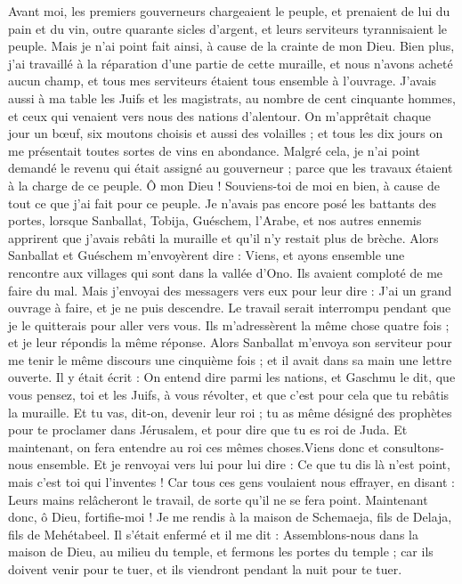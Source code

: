 \begin{multicols}{2}
Avant moi, les premiers gouverneurs chargeaient le peuple, et prenaient de lui du pain et du vin, outre quarante sicles d'argent, et leurs serviteurs tyrannisaient le peuple. Mais je n'ai point fait ainsi, à cause de la crainte de mon Dieu.
Bien plus, j'ai travaillé à la réparation d’une partie de cette muraille, et nous n'avons acheté aucun champ, et tous mes serviteurs étaient tous ensemble à l'ouvrage.
J'avais aussi à ma table les Juifs et les magistrats, au nombre de cent cinquante hommes, et ceux qui venaient vers nous des nations d’alentour.
On m’apprêtait chaque jour un bœuf, six moutons choisis et aussi des volailles ; et tous les dix jours on me présentait toutes sortes de vins en abondance. Malgré cela, je n'ai point demandé le revenu qui était assigné au gouverneur ; parce que les travaux étaient à la charge de ce peuple.
Ô mon Dieu ! Souviens-toi de moi en bien, à cause de tout ce que j'ai fait pour ce peuple.
\VerseOne{}Je n'avais pas encore posé les battants des portes, lorsque Sanballat, Tobija, Guéschem, l'Arabe, et nos autres ennemis apprirent que j'avais rebâti la muraille et qu'il n'y restait plus de brèche.
Alors Sanballat et Guéschem m’envoyèrent dire : Viens, et ayons ensemble une rencontre aux villages qui sont dans la vallée d'Ono. Ils avaient comploté de me faire du mal.
Mais j'envoyai des messagers vers eux pour leur dire : J’ai un grand ouvrage à faire, et je ne puis descendre. Le travail serait interrompu pendant que je le quitterais pour aller vers vous.
Ils m'adressèrent la même chose quatre fois ; et je leur répondis la même réponse.
Alors Sanballat m’envoya son serviteur pour me tenir le même discours une cinquième fois ; et il avait dans sa main une lettre ouverte.
Il y était écrit : On entend dire parmi les nations, et Gaschmu le dit, que vous pensez, toi et les Juifs, à vous révolter, et que c'est pour cela que tu rebâtis la muraille. Et tu vas, dit-on, devenir leur roi ;
tu as même désigné des prophètes pour te proclamer dans Jérusalem, et pour dire que tu es roi de Juda. Et maintenant, on fera entendre au roi ces mêmes choses.Viens donc et consultons-nous ensemble.
Et je renvoyai vers lui pour lui dire : Ce que tu dis là n'est point, mais c'est toi qui l'inventes !
Car tous ces gens voulaient nous effrayer, en disant : Leurs mains relâcheront le travail, de sorte qu'il ne se fera point. Maintenant donc, ô Dieu, fortifie-moi !
Je me rendis à la maison de Schemaeja, fils de Delaja, fils de Mehétabeel. Il s'était enfermé et il me dit : Assemblons-nous dans la maison de Dieu, au milieu du temple, et fermons les portes du temple ; car ils doivent venir pour te tuer, et ils viendront pendant la nuit pour te tuer.

\end{multicols}
